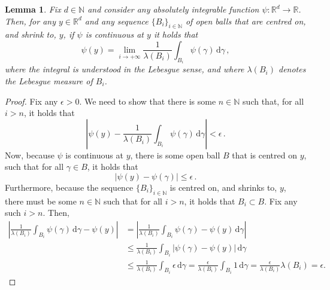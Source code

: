 \documentclass[3p]{elsarticle}
\newtheorem{lemma}[theorem]{Lemma}
\newcommand{\nats}{\mathbb{N}}
\newcommand{\reals}{\mathbb{R}}
\newcommand{\abs}[1]{\left\vert #1 \right\vert}
\begin{document}
\begin{lemma}\label{lemma:lebesgue_differentiation_theorem}
Fix $d\in\nats$ and consider any absolutely integrable function $\psi:\reals^d\to \reals$. Then, for any $y\in\reals^d$ and any sequence $\{B_i\}_{i\in\nats}$ of open balls that are centred on, and shrink to, $y$, if $\psi$ is continuous at $y$ it holds that
\begin{equation*}
\psi(y) = \lim_{i\to+\infty} \frac{1}{\lambda(B_i)}\int_{B_i}\psi(\gamma)\,\mathrm{d}\gamma\,,
\end{equation*}
where the integral is understood in the Lebesgue sense, and where $\lambda(B_i)$ denotes the Lebesgue measure of $B_i$.
\end{lemma}
\begin{proof}
Fix any $\epsilon>0$. We need to show that there is some $n\in\nats$ such that, for all $i>n$, it holds that
\begin{equation*}
\abs{\psi(y) - \frac{1}{\lambda(B_i)}\int_{B_i}\psi(\gamma)\,\mathrm{d}\gamma} < \epsilon\,.
\end{equation*}
Now, because $\psi$ is continuous at $y$, there is some open ball $B$ that is centred on $y$, such that for all $\gamma\in B$, it holds that
\begin{equation*}
\abs{\psi(y)-\psi(\gamma)} \leq \epsilon\,.
\end{equation*}
Furthermore, because the sequence $\{B_i\}_{i\in\nats}$ is centred on, and shrinks to, $y$, there must be some $n\in\nats$ such that for all $i>n$, it holds that $B_i\subset B$. Fix any such $i>n$. Then,
\begin{align*}
\abs{\frac{1}{\lambda(B_i)}\int_{B_i}\psi(\gamma)\,\mathrm{d}\gamma - \psi(y)} &= \abs{\frac{1}{\lambda(B_i)}\int_{B_i}\psi(\gamma) - \psi(y)\,\mathrm{d}\gamma} \\
 &\leq \frac{1}{\lambda(B_i)}\int_{B_i}\abs{\psi(\gamma) - \psi(y)}\,\mathrm{d}\gamma \\
 &\leq \frac{1}{\lambda(B_i)}\int_{B_i}\epsilon\,\mathrm{d}\gamma
 = \frac{\epsilon}{\lambda(B_i)}\int_{B_i}1\,\mathrm{d}\gamma
 = \frac{\epsilon}{\lambda(B_i)}\lambda(B_i)=\epsilon.
\end{align*}
\end{proof}
\end{document}
